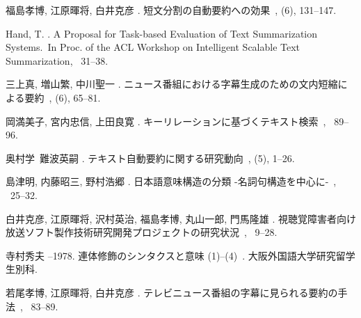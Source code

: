 \begin{thebibliography}{}

福島孝博, 江原暉将, 白井克彦 \BBCP.
\newblock \JBOQ 短文分割の自動要約への効果\JBCQ\
\newblock {}, {}  (6), 131--147.

Hand, T. \BBCP.
\newblock \BBOQ A Proposal for Task-based Evaluation of Text Summarization
  Systems.\BBCQ\
\newblock In {\Bem Proc. of the ACL Workshop on Intelligent Scalable Text
  Summarization}, \BPGS\ 31--38.

三上真, 増山繁, 中川聖一 \BBCP.
\newblock \JBOQ ニュース番組における字幕生成のための文内短縮による要約\JBCQ\
\newblock {}, {}  (6), 65--81.

岡満美子, 宮内忠信, 上田良寛 \BBOP 1998\BBCP.
\newblock \JBOQ キーリレーションに基づくテキスト検索\JBCQ\
\newblock {}, \BPGS\ 89--96.

奥村学\BBACOMMA\  難波英嗣 \BBOP 1999\BBCP.
\newblock \JBOQ テキスト自動要約に関する研究動向\JBCQ\
\newblock {}, {}  (5), 1--26.

島津明, 内藤昭三, 野村浩郷 \BBCP.
\newblock \JBOQ 日本語意味構造の分類 -名詞句構造を中心に-\JBCQ\
\newblock {}, \BPGS\ 25--32.

白井克彦, 江原暉将, 沢村英治, 福島孝博, 丸山一郎, 門馬隆雄 \BBOP 1985\BBCP.
\newblock \JBOQ 視聴覚障害者向け放送ソフト製作技術研究開発プロジェクトの研究状況\JBCQ\
\newblock {}, \BPGS\ 9--28.

寺村秀夫 --1978\BBCP.
\newblock \JBOQ 連体修飾のシンタクスと意味 (1)--(4)\JBCQ\
\newblock {}. 大阪外国語大学研究留学生別科.

若尾孝博, 江原暉将, 白井克彦 \BBOP 1997\BBCP.
\newblock \JBOQ テレビニュース番組の字幕に見られる要約の手法\JBCQ\
\newblock {}, \BPGS\ 83--89.


\end{thebibliography}
